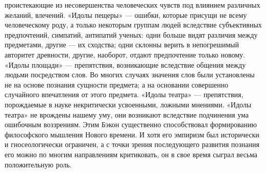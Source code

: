 \documentclass[12pt]{article}
\begin{document}
проистекающие  из несовершенства   человеческих   чувств   под влиянием различных желаний, влечений.
«Идолы пещеры» — ошибки, которые присущи не всему человеческому роду, а только некоторым группам
людей вследствие субъективных предпочтений, симпатий, антипатий ученых: одни больше видят различия
между предметами, другие — их сходства; одни склонны верить в непогрешимый авторитет древности, другие,
наоборот, отдают предпочтение только новому. «Идолы  площади» — препятствия, возникающие вследствие
общения между людьми посредством слов. Во многих случаях значения слов были установлены не на
основе познания сущности предмета; а на основании совершенно случайного впечатления от этого предмета.
«Идолы театра» — препятствия, порождаемые в науке некритически усвоенными, ложными мнениями. «Идолы
театра» не врождены нашему уму, они возникают вследствие подчинения ума ошибочным воззрениям.
Этим Бэкон существенно способствовал формированию философского мышления Нового времени. И хотя
его  эмпиризм  был  исторически  и  гносеологически  ограничен,  а  с  точки  зрения  последующего  развития
познания его можно по многим  направлениям критиковать, он в свое время сыграл весьма положительную
роль.
\end{document}
